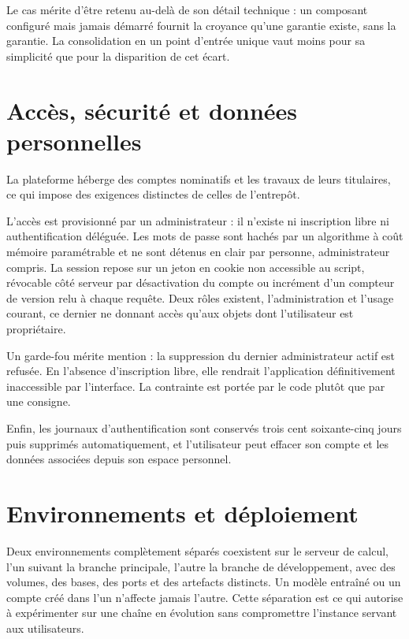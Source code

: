 \begin{remarque}[title={Une protection non déployée est une protection absente}]
Le cas mérite d'être retenu au-delà de son détail technique : un composant configuré mais jamais
démarré fournit la croyance qu'une garantie existe, sans la garantie. La consolidation en un
point d'entrée unique vaut moins pour sa simplicité que pour la disparition de cet écart.
\end{remarque}

\section{Accès, sécurité et données personnelles}

La plateforme héberge des comptes nominatifs et les travaux de leurs titulaires, ce qui impose
des exigences distinctes de celles de l'entrepôt.

L'accès est provisionné par un administrateur : il n'existe ni inscription libre ni
authentification déléguée. Les mots de passe sont hachés par un algorithme à coût mémoire
paramétrable et ne sont détenus en clair par personne, administrateur compris. La session
repose sur un jeton en cookie non accessible au script, révocable côté serveur par
désactivation du compte ou incrément d'un compteur de version relu à chaque requête. Deux rôles
existent, l'administration et l'usage courant, ce dernier ne donnant accès qu'aux objets dont
l'utilisateur est propriétaire.

Un garde-fou mérite mention : la suppression du dernier administrateur actif est refusée. En
l'absence d'inscription libre, elle rendrait l'application définitivement inaccessible par
l'interface. La contrainte est portée par le code plutôt que par une consigne.

Enfin, les journaux d'authentification sont conservés trois cent soixante-cinq jours puis
supprimés automatiquement, et l'utilisateur peut effacer son compte et les données associées
depuis son espace personnel.

\section{Environnements et déploiement}

Deux environnements complètement séparés coexistent sur le serveur de calcul, l'un suivant la
branche principale, l'autre la branche de développement, avec des volumes, des bases, des
ports et des artefacts distincts. Un modèle entraîné ou un compte créé dans l'un n'affecte
jamais l'autre. Cette séparation est ce qui autorise à expérimenter sur une chaîne en évolution
sans compromettre l'instance servant aux utilisateurs.

